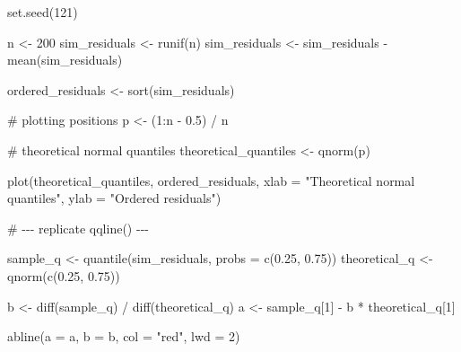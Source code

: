 \documentclass[
  letterpaper,
  8pt,
  a4paper]{book}
\newenvironment{Shaded}{\begin{snugshade}}{\end{snugshade}}
\newcommand{\AttributeTok}[1]{\textcolor[rgb]{0.40,0.45,0.13}{#1}}
\newcommand{\CommentTok}[1]{\textcolor[rgb]{0.37,0.37,0.37}{#1}}
\newcommand{\DecValTok}[1]{\textcolor[rgb]{0.68,0.00,0.00}{#1}}
\newcommand{\FloatTok}[1]{\textcolor[rgb]{0.68,0.00,0.00}{#1}}
\newcommand{\FunctionTok}[1]{\textcolor[rgb]{0.28,0.35,0.67}{#1}}
\newcommand{\NormalTok}[1]{\textcolor[rgb]{0.00,0.23,0.31}{#1}}
\newcommand{\OtherTok}[1]{\textcolor[rgb]{0.00,0.23,0.31}{#1}}
\newcommand{\SpecialCharTok}[1]{\textcolor[rgb]{0.37,0.37,0.37}{#1}}
\newcommand{\StringTok}[1]{\textcolor[rgb]{0.13,0.47,0.30}{#1}}
\begin{document}
\begin{Shaded}
\begin{Highlighting}[]
\FunctionTok{set.seed}\NormalTok{(}\DecValTok{121}\NormalTok{)}

\NormalTok{n }\OtherTok{\textless{}{-}} \DecValTok{200}
\NormalTok{sim\_residuals }\OtherTok{\textless{}{-}} \FunctionTok{runif}\NormalTok{(n)}
\NormalTok{sim\_residuals }\OtherTok{\textless{}{-}}\NormalTok{ sim\_residuals }\SpecialCharTok{{-}} \FunctionTok{mean}\NormalTok{(sim\_residuals)}

\NormalTok{ordered\_residuals }\OtherTok{\textless{}{-}} \FunctionTok{sort}\NormalTok{(sim\_residuals)}

\CommentTok{\# plotting positions}
\NormalTok{p }\OtherTok{\textless{}{-}}\NormalTok{ (}\DecValTok{1}\SpecialCharTok{:}\NormalTok{n }\SpecialCharTok{{-}} \FloatTok{0.5}\NormalTok{) }\SpecialCharTok{/}\NormalTok{ n}

\CommentTok{\# theoretical normal quantiles}
\NormalTok{theoretical\_quantiles }\OtherTok{\textless{}{-}} \FunctionTok{qnorm}\NormalTok{(p)}

\FunctionTok{plot}\NormalTok{(theoretical\_quantiles, ordered\_residuals,}
     \AttributeTok{xlab =} \StringTok{"Theoretical normal quantiles"}\NormalTok{,}
     \AttributeTok{ylab =} \StringTok{"Ordered residuals"}\NormalTok{)}

\CommentTok{\# {-}{-}{-} replicate qqline() {-}{-}{-}}

\NormalTok{sample\_q }\OtherTok{\textless{}{-}} \FunctionTok{quantile}\NormalTok{(sim\_residuals, }\AttributeTok{probs =} \FunctionTok{c}\NormalTok{(}\FloatTok{0.25}\NormalTok{, }\FloatTok{0.75}\NormalTok{))}
\NormalTok{theoretical\_q }\OtherTok{\textless{}{-}} \FunctionTok{qnorm}\NormalTok{(}\FunctionTok{c}\NormalTok{(}\FloatTok{0.25}\NormalTok{, }\FloatTok{0.75}\NormalTok{))}

\NormalTok{b }\OtherTok{\textless{}{-}} \FunctionTok{diff}\NormalTok{(sample\_q) }\SpecialCharTok{/} \FunctionTok{diff}\NormalTok{(theoretical\_q)}
\NormalTok{a }\OtherTok{\textless{}{-}}\NormalTok{ sample\_q[}\DecValTok{1}\NormalTok{] }\SpecialCharTok{{-}}\NormalTok{ b }\SpecialCharTok{*}\NormalTok{ theoretical\_q[}\DecValTok{1}\NormalTok{]}

\FunctionTok{abline}\NormalTok{(}\AttributeTok{a =}\NormalTok{ a, }\AttributeTok{b =}\NormalTok{ b, }\AttributeTok{col =} \StringTok{"red"}\NormalTok{, }\AttributeTok{lwd =} \DecValTok{2}\NormalTok{)}
\end{Highlighting}
\end{Shaded}
\end{document}
